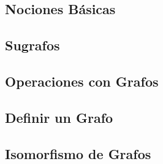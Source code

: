 \subsection{Nociones Básicas}
\subsection{Sugrafos}
\subsection{Operaciones con Grafos}
\subsection{Definir un Grafo}
\subsection{Isomorfismo de Grafos}